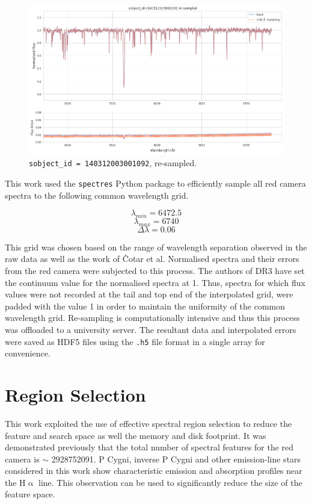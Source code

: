 \begin{figure}[!htb]
\centering
\includegraphics[scale=.40]{figures/resampling example.png}
\caption{\texttt{sobject\_id = 140312003001092}, re-sampled.}
\end{figure}

This work used the \texttt{spectres} Python package\cite{carnall2017spectres} to efficiently sample all red camera spectra to the following common wavelength grid.

\[\lambda_{min} = 6472.5\]
\[\lambda_{max} = 6740\]
\[\Delta\lambda = 0.06\]

This grid was chosen based on the range of wavelength separation observed in the raw data as well as the work of Čotar et al. Normalised spectra and their errors from the red camera were subjected to this process. The authors of DR3 have set the continuum value for the normalised spectra at 1. Thus, spectra for which flux values were not recorded at the tail and top end of the interpolated grid, were padded with the value 1 in order to maintain the uniformity of the common wavelength grid. Re-sampling is computationally intensive and thus this process was offloaded to a university server. The resultant data and interpolated errors were saved as HDF5 files using the \texttt{.h5} file format in a single array for convenience. 

\section{Region Selection}

This work exploited the use of effective spectral region selection to reduce the feature and search space as well the memory and disk footprint. It was demonstrated previously that the total number of spectral features for the red camera is $\sim$ \num[round-precision=2,round-mode=figures, scientific-notation=true]{2928752091}. P Cygni, inverse P Cygni and other emission-line stars considered in this work show characteristic emission and absorption profiles near the H$\upalpha$ line. This observation can be used to significantly reduce the size of the feature space. 

